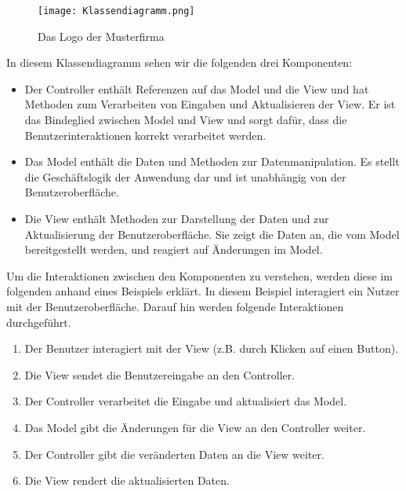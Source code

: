 \begin{figure}[h]
\centering
\texttt{[image: Klassendiagramm.png]}
\caption{Das Logo der Musterfirma\footnotemark}
\end{figure}

In diesem Klassendiagramm sehen wir die folgenden drei Komponenten:
\newpage
\begin{itemize}
\item Der Controller enthält Referenzen auf das Model und die View und hat Methoden zum Verarbeiten von Eingaben und Aktualisieren der View. Er ist das Bindeglied zwischen Model und View und sorgt dafür, dass die Benutzerinteraktionen korrekt verarbeitet werden.

\item Das Model enthält die Daten und Methoden zur Datenmanipulation. Es stellt die Geschäftslogik der Anwendung dar und ist unabhängig von der Benutzeroberfläche.

\item Die View enthält Methoden zur Darstellung der Daten und zur Aktualisierung der Benutzeroberfläche. Sie zeigt die Daten an, die vom Model bereitgestellt werden, und reagiert auf Änderungen im Model.
\end{itemize}

Um die Interaktionen zwischen den Komponenten zu verstehen, werden diese im folgenden anhand eines Beispiels erklärt. In diesem Beispiel interagiert ein Nutzer mit der Benutzeroberfläche. Darauf hin werden folgende Interaktionen durchgeführt.

\begin{enumerate}
\item Der Benutzer interagiert mit der View (z.B. durch Klicken auf einen Button).

\item Die View sendet die Benutzereingabe an den Controller.

\item Der Controller verarbeitet die Eingabe und aktualisiert das Model.

\item Das Model gibt die Änderungen für die View an den Controller weiter.

\item Der Controller gibt die veränderten Daten an die View weiter.

\item Die View rendert die aktualisierten Daten.
\end{enumerate}

